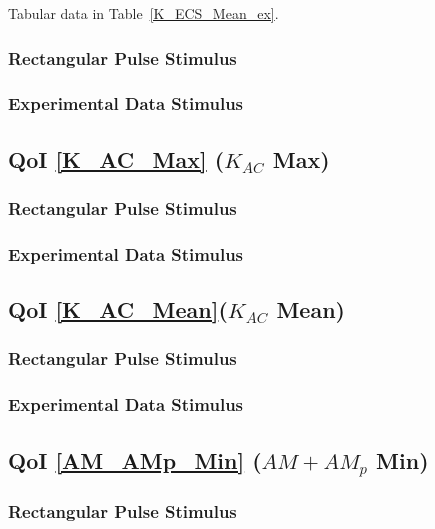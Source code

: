 \documentclass[12pt]{article}
\numberwithin{equation}{section}
\begin{document}
Tabular data in Table~\ref{K_ECS_Mean_ex}.

\subsubsection{Rectangular Pulse Stimulus}

\subsubsection{Experimental Data Stimulus}

\subsection{QoI \eqref{K_AC_Max} ($K_{AC}$ Max)}

\subsubsection{Rectangular Pulse Stimulus}

\subsubsection{Experimental Data Stimulus}

\subsection{QoI \eqref{K_AC_Mean}($K_{AC}$ Mean)}

\subsubsection{Rectangular Pulse Stimulus}

\subsubsection{Experimental Data Stimulus}

\newpage
\subsection{QoI \eqref{AM_AMp_Min} ($AM+AM_p$ Min)}

\subsubsection{Rectangular Pulse Stimulus}
\end{document}

